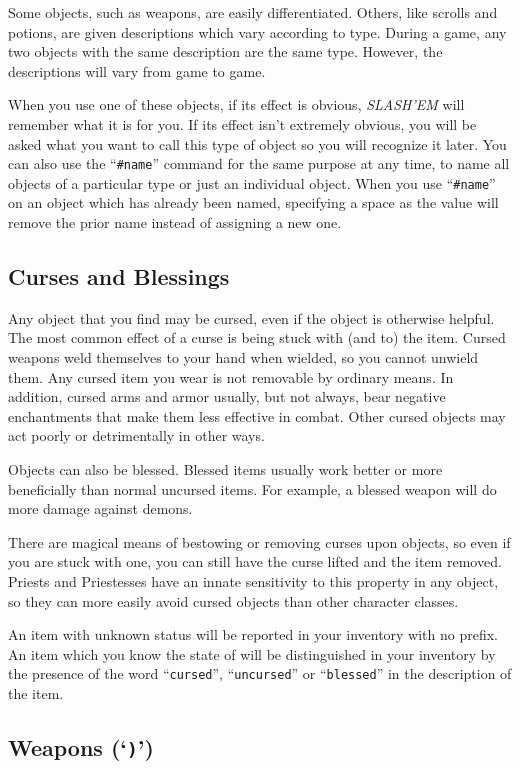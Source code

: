 Some objects, such as weapons, are easily differentiated.  Others, like
scrolls and potions, are given descriptions which vary according to
type.  During a game, any two objects with the same description are
the same type.  However, the descriptions will vary from game to game.

When you use one of these objects, if its effect is obvious, {\it SLASH'EM\/}
will remember what it is for you.  If its effect isn't extremely
obvious, you will be asked what you want to call this type of object
so you will recognize it later.  You can also use the ``{\tt \#name}''
command for the same purpose at any time, to name all objects of a
particular type or just an individual object.
When you use ``{\tt \#name}'' on an object which has already been named,
specifying a space as the value will remove the prior name instead
of assigning a new one.
\subsection*{Curses and Blessings}


Any object that you find may be cursed, even if the object is
otherwise helpful.  The most common effect of a curse is being stuck
with (and to) the item.  Cursed weapons weld themselves to your hand
when wielded, so you cannot unwield them.  Any cursed item you wear
is not removable by ordinary means.  In addition, cursed arms and armor
usually, but not always, bear negative enchantments that make them
less effective in combat.  Other cursed objects may act poorly or
detrimentally in other ways.

Objects can also be blessed.  Blessed items usually work better or
more beneficially than normal uncursed items.  For example, a blessed
weapon will do more damage against demons.

There are magical means of bestowing or removing curses upon objects,
so even if you are stuck with one, you can still have the curse
lifted and the item removed.  Priests and Priestesses have an innate
sensitivity to this property in any object, so they can more easily avoid
cursed objects than other character classes.

An item with unknown status will be reported in your inventory with no prefix.
An item which you know the state of will be distinguished in your inventory
by the presence of the word ``{\tt cursed}'', ``{\tt uncursed}'' or ``{\tt blessed}'' in the
description of the item.
\subsection*{Weapons (`{\tt )}')}

